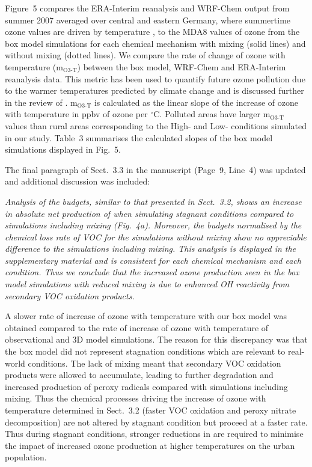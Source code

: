 \documentclass{article}
\DeclareRobustCommand*\degree{\ensuremath{^{\circ}}}
\begin{document}
{Figure~5 compares the ERA-Interim reanalysis and WRF-Chem output from summer 2007 averaged over central and eastern Germany, where summertime ozone values are driven by temperature \citep{Otero:2016}, to the MDA8 values of ozone from the box model simulations for each chemical mechanism with mixing (solid lines) and without mixing (dotted lines).
We compare the rate of change of ozone with temperature (m$_{\text{O3-T}}$) between the box model, WRF-Chem and ERA-Interim reanalysis data.
This metric has been used to quantify future ozone pollution due to the warmer temperatures predicted by climate change \citep{Dawson:2007, Rasmussen:2013} and is discussed further in the review of \citet{Pusede:2015}.
m$_{\text{O3-T}}$ is calculated as the linear slope of the increase of ozone with temperature in ppbv of ozone per \degree C.
Polluted areas have larger m$_{\text{O3-T}}$ values than rural areas corresponding to the High- and Low- conditions simulated in our study.  
Table~3 summarises the calculated slopes of the box model simulations displayed in Fig.~5.
}

The final paragraph of Sect.~3.3 in the manuscript (Page~9, Line~4) was updated and additional discussion was included:
{\itshape
Analysis of the  budgets, similar to that presented in Sect.~3.2, shows an increase in absolute net production of  when simulating stagnant conditions compared to simulations including mixing (Fig.~4a).
Moreover, the  budgets normalised by the chemical loss rate of VOC for the simulations without mixing show no appreciable difference to the simulations including mixing.
This analysis is displayed in the supplementary material and is consistent for each chemical mechanism and each  condition.
Thus we conclude that the increased ozone production seen in the box model simulations with reduced mixing is due to enhanced OH reactivity from secondary VOC oxidation products.

A slower rate of increase of ozone with temperature with our box model was obtained compared to the rate of increase of ozone with temperature of observational and 3D model simulations.
The reason for this discrepancy was that the box model did not represent stagnation conditions which are relevant to real-world conditions.
The lack of mixing meant that secondary VOC oxidation products were allowed to accumulate, leading to further degradation and increased production of peroxy radicals compared with simulations including mixing. 
Thus the chemical processes driving the increase of ozone with temperature determined in Sect.~3.2 (faster VOC oxidation and peroxy nitrate decomposition) are not altered by stagnant condition but proceed at a faster rate.
Thus during stagnant conditions, stronger reductions in  are required to minimise the impact of increased ozone production at higher temperatures on the urban population.
}
\end{document}
